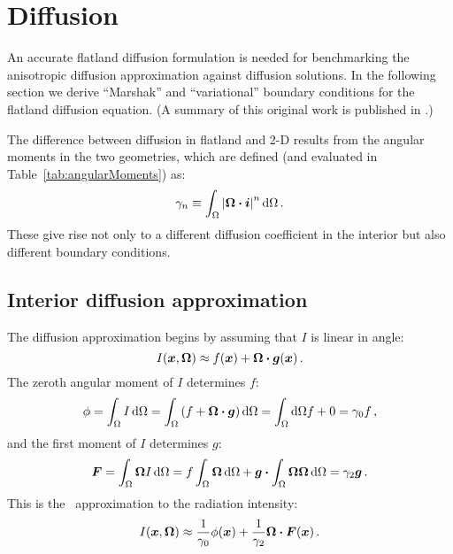 
\section{Diffusion}

An accurate flatland diffusion formulation
is needed for benchmarking the anisotropic diffusion
approximation against diffusion solutions.
In the following section we derive ``Marshak'' and ``variational'' boundary
conditions for the flatland diffusion equation. (A summary of this original
work is published in \cite{Joh2011a}.)

The difference between diffusion in flatland and 2-D results from the
angular moments in the two geometries, which
are defined (and evaluated in Table~\ref{tab:angularMoments}) as:
\begin{equation*}
  \gamma_n \equiv \int_\Omega \left| \bm{\Omega} \bm{\cdot} \bm{i} \right|^n \mathop{}\!\mathrm{d} \Omega\,.
\end{equation*}
These give rise not only to a different diffusion coefficient in the interior
but also different boundary conditions.

\subsection{Interior diffusion approximation}

The diffusion approximation begins by assuming that $I$ is linear in angle:
\begin{equation*}
  I(\bm{x}, \bm{\Omega}) \approx f(\bm{x}) + \bm{\Omega} \bm{\cdot}
  \bm{g}(\bm{x})\,.
\end{equation*}
The zeroth angular moment of $I$ determines $f$:
\begin{equation*}
  \phi = \int_\Omega I \mathop{}\!\mathrm{d} \Omega
= \int_\Omega \left( f + \bm{\Omega}\bm{\cdot} \bm{g} \right) \mathop{}\!\mathrm{d}\Omega
= \int_\Omega\mathop{}\!\mathrm{d}\Omega f + 0
= \gamma_0 f \,,
\end{equation*}
and the first moment of $I$ determines $g$:
\begin{equation*}
  \bm{F} = \int_\Omega \bm{\Omega} I \mathop{}\!\mathrm{d} \Omega
= f \int_\Omega \bm{\Omega} \mathop{}\!\mathrm{d}\Omega
  + \bm{g} \bm{\cdot} \int_\Omega \bm{\Omega}\bm{\Omega} \mathop{}\!\mathrm{d}\Omega
= \gamma_2 \bm{g} \,.
\end{equation*}
This is the \Pone\ approximation to the radiation intensity:
\begin{equation}\label{eq:ssPone}
  I(\bm{x}, \bm{\Omega})
  \approx \frac{1}{\gamma_0} \phi(\bm{x})
  + \frac{1}{\gamma_2} \bm{\Omega} \bm{\cdot} \bm{F}(\bm{x})\,.
\end{equation}

